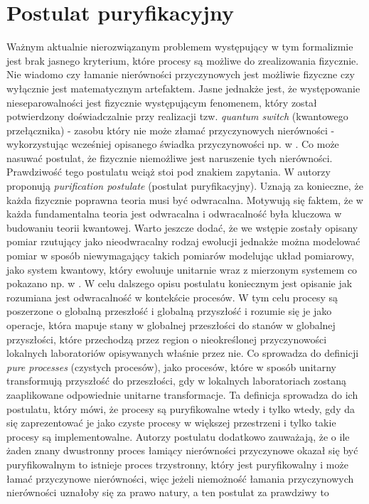 \documentclass[10pt]{article} %
\begin{document}
\section{Postulat puryfikacyjny}
Ważnym aktualnie nierozwiązanym problemem występujący w tym formalizmie jest brak jasnego kryterium, które procesy są możliwe do zrealizowania fizycznie.
Nie wiadomo czy łamanie nierówności przyczynowych jest możliwie fizyczne czy wyłącznie jest matematycznym artefaktem. Jasne jednakże jest, że występowanie nieseparowalności jest fizycznie występującym fenomenem, który został potwierdzony doświadczalnie przy realizacji tzw. \textit{quantum switch}
(kwantowego przełącznika) - zasobu który nie może złamać przyczynowych nierówności - wykorzystując wcześniej opisanego świadka przyczynowości np. w \cite{experiment}. Co może nasuwać postulat, że fizycznie niemożliwe jest naruszenie tych nierówności. Prawdziwość tego postulatu wciąż stoi pod znakiem zapytania. W \cite{purification} autorzy proponują \textit{purification postulate} (postulat puryfikacyjny). Uznają za konieczne, że każda fizycznie poprawna teoria
musi być odwracalna. Motywują się faktem, że w każda fundamentalna teoria jest odwracalna i odwracalność była kluczowa w budowaniu teorii kwantowej.
Warto jeszcze dodać, że we wstępie zostały opisany pomiar rzutujący jako nieodwracalny rodzaj ewolucji jednakże można modelować pomiar w sposób niewymagający takich pomiarów modelując układ pomiarowy, jako system kwantowy, który ewoluuje unitarnie wraz z mierzonym systemem co pokazano np. w
\cite{reversible}. W celu dalszego opisu postulatu koniecznym jest opisanie jak rozumiana jest odwracalność w kontekście procesów. W tym celu procesy są poszerzone o globalną przeszłość i globalną przyszłość i rozumie się je jako operacje, która mapuje stany w globalnej przeszłości do stanów w globalnej przyszłości, które przechodzą przez region o nieokreślonej przyczynowości lokalnych laboratoriów opisywanych właśnie przez nie. Co sprowadza do definicji \textit{pure processes} (czystych procesów), jako procesów, które w sposób unitarny transformują przyszłość do przeszłości, gdy w lokalnych laboratoriach zostaną zaaplikowane odpowiednie unitarne transformacje. Ta definicja sprowadza do ich postulatu, który mówi, że procesy są puryfikowalne wtedy i tylko wtedy, gdy da się zaprezentować je jako czyste procesy w większej przestrzeni i tylko takie procesy są implementowalne. Autorzy postulatu dodatkowo zauważają, że
o ile żaden znany dwustronny proces łamiący nierówności przyczynowe okazał się być puryfikowalnym to istnieje proces trzystronny, który jest puryfikowalny i może łamać przyczynowe nierówności, więc jeżeli niemożność łamania przyczynowych nierówności uznałoby się za prawo natury, a ten postulat za prawdziwy to
\end{document}

